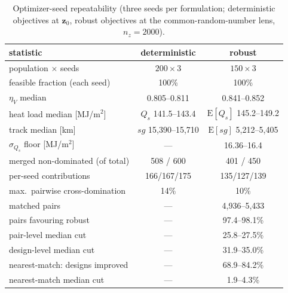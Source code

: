 \begin{table}[htbp]
\centering
\caption{Optimizer-seed repeatability (three seeds per formulation;
  deterministic objectives at $\mathbf{z}_0$, robust objectives at the
  common-random-number lens, $n_z=2000$).}
\label{tab:seeds}
\begin{tabular}{lcc}
\toprule
statistic & deterministic & robust \\
\midrule
population $\times$ seeds            & $200\times3$ & $150\times3$ \\
feasible fraction (each seed)        & 100\%       & 100\% \\
$\eta_V$ median                      & 0.805--0.811 & 0.841--0.852 \\
heat load median [MJ/m$^2$]
  & $Q_s$ 141.5--143.4 & $\mathrm{E}[Q_s]$ 145.2--149.2 \\
track median [km]
  & $sg$ 15{,}390--15{,}710 & $\mathrm{E}[sg]$ 5{,}212--5{,}405 \\
$\sigma_{Q_s}$ floor [MJ/m$^2$]     & --- & 16.36--16.4 \\
merged non-dominated (of total)      & 508 / 600  & 401 / 450 \\
per-seed contributions               & 166/167/175 & 135/127/139 \\
max.\ pairwise cross-domination      & 14\%        & 10\% \\
\midrule
matched pairs                        & --- & 4{,}936--5{,}433 \\
pairs favouring robust               & --- & 97.4--98.1\% \\
pair-level median cut                & --- & 25.8--27.5\% \\
design-level median cut              & --- & 31.9--35.0\% \\
nearest-match: designs improved      & --- & 68.9--84.2\% \\
nearest-match median cut             & --- & 1.9--4.3\% \\
\bottomrule
\end{tabular}
\end{table}
